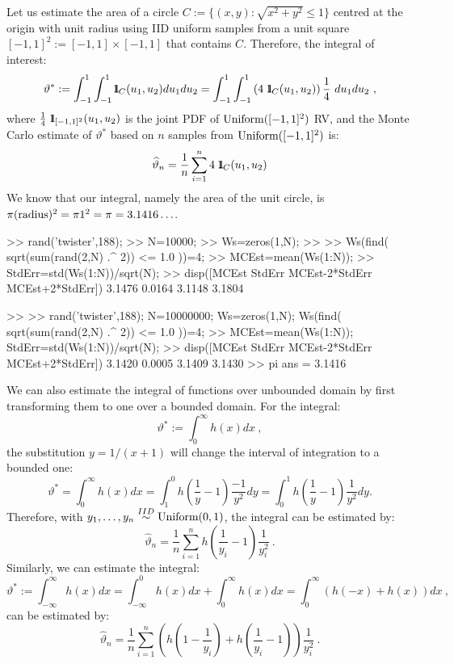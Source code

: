 \begin{labwork}\label{LW:2DintegralOverRectangle}
Let us estimate the area of a circle $C:=\{(x,y): \sqrt{x^2+y^2} \leq 1\}$ centred at the origin with unit radius using IID uniform samples from a unit square $[-1,1]^2 := [-1,1] \times [-1,1]$ that contains $C$.  Therefore, the integral of interest:
$$
\vartheta^*:=\int_{-1}^{1} \int_{-1}^1 {1}\mspace{-11 mu}{1}_C (u_1,u_2) d u_1 d u_2 =\int_{-1}^{1} \int_{-1}^1 \left( 4 \ {1}\mspace{-11 mu}{1}_C (u_1,u_2) \right) \frac{1}{4} \ d u_1 d u_2 \ ,
$$ where $ \frac{1}{4} \ {1}\mspace{-11 mu}{1}_{[-1,1]^2} (u_1,u_2)$ is the joint PDF of $\mbox{{\rm Uniform}}([-1,1]^2)$ RV, and the Monte Carlo estimate of $\vartheta^*$ based on $n$ samples from $\mbox{{\rm Uniform}}([-1,1]^2)$ is:
\[
\widehat{\vartheta}_n = \frac{1}{n} \sum_{i=1}^n 4 \ {1}\mspace{-11 mu}{1}_{C} (u_1,u_2) 
\]
We know that our integral, namely the area of the unit circle, is $\pi ({\rm radius})^2=\pi 1^2=\pi=3.1416\ldots$.
\begin{VrbM}
>> rand('twister',188);%
>> N=10000; %
>> Ws=zeros(1,N); %
>> %
>> Ws(find( sqrt(sum(rand(2,N) .^ 2)) <= 1.0 ))=4; 
>> MCEst=mean(Ws(1:N)); %
>> StdErr=std(Ws(1:N))/sqrt(N); %
>> disp([MCEst StdErr MCEst-2*StdErr MCEst+2*StdErr])%
    3.1476    0.0164    3.1148    3.1804

>> %
>> rand('twister',188); N=10000000; Ws=zeros(1,N); Ws(find( sqrt(sum(rand(2,N) .^ 2)) <= 1.0 ))=4;
>> MCEst=mean(Ws(1:N)); StdErr=std(Ws(1:N))/sqrt(N);
>> disp([MCEst StdErr MCEst-2*StdErr MCEst+2*StdErr])
    3.1420    0.0005    3.1409    3.1430
>> pi %
ans =    3.1416
\end{VrbM}
\end{labwork}

We can also estimate the integral of functions over unbounded domain by first transforming them to one over a bounded domain.
For the integral:
$$\vartheta^* :=\int^{\infty}_0h(x)dx \ ,$$
the substitution $y=1/(x+1)$ will change the interval of integration to a bounded one:
$$\vartheta^*=\int^{\infty}_0h(x)dx=\int^0_1 h \left( \frac{1}{y}-1 \right) \frac{-1}{y^2}dy=\int^1_0 h \left( \frac{1}{y}-1 \right) \frac{1}{y^2}dy.$$
Therefore, with $y_1,\ldots,y_n \overset{IID}{\sim} \mbox{{\rm Uniform}}(0,1)$, the integral can be estimated by:
$$
\widehat{\vartheta}_n=\frac{1}{n}\sum^n_{i=1} h \left(\frac{1}{y_i}-1\right) \frac{1}{y_i^2} \ .
$$
Similarly, we can estimate the integral:
$$
\vartheta^* := \int^{\infty}_{-\infty}h(x)dx=\int^{0}_{-\infty}h(x)dx+\int^{\infty}_{0}h(x)dx=\int^{\infty}_{0} \left( h(-x)+h(x) \right) dx \ ,
$$
can be estimated by:
$$\widehat{\vartheta}_n=\frac{1}{n}\sum^n_{i=1} \left( h \left(1-\frac{1}{y_i} \right)+h\left( \frac{1}{y_i}-1 \right) \right) \frac{1}{y_i^2} \ .
$$

